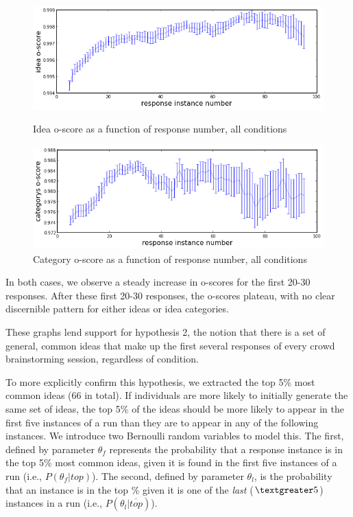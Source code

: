 \begin{figure}[h]
    \centering
    \includegraphics[width=0.9\columnwidth]{idea_oscore_order}
    \caption{Idea o-score as a function of response number, all conditions}
    \label{fig:idea_oscore_order}
    \includegraphics[width=0.9\columnwidth]{cat_oscore_order}
    \caption{Category o-score as a function of response number, all conditions}
    \label{fig:cat_oscore_order}
\end{figure}

In both cases, we observe a steady increase in o-scores for the first 20-30 responses. After these first 20-30 responses, the o-scores plateau, with no clear discernible pattern for either ideas or idea categories.

These graphs lend support for hypothesis 2, the notion that there is a set of general, common ideas that make up the first several responses of every crowd brainstorming session, regardless of condition.

To more explicitly confirm this hypothesis, we extracted the top 5\% most common ideas (66 in total). If individuals are more likely to initially generate the same set of ideas, the top 5\% of the ideas should be more likely to appear in the first five instances of a run than they are to appear in any of the following instances. We introduce two Bernoulli random variables to model this. The first, defined by parameter $\theta_f$ represents the probability that a response instance is in the top 5\% most common ideas, given it is found in the first five instances of a run (i.e., $P(\theta_f|top)$). The second, defined by parameter $\theta_l$, is the probability that an instance is in the top \% given it is one of the \emph{last} ($\textgreater5$) instances in a run (i.e., $P(\theta_l|\overline{top})$).

